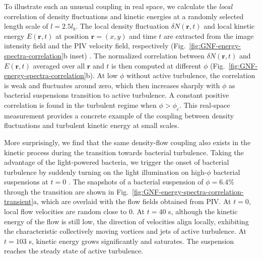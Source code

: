 \documentclass[twocolumn,aps,prx,amsmath,amssymb,longbibliography]{revtex4-2}
\begin{document}
To illustrate such an unusual coupling in real space, we calculate the \emph{local} correlation of density fluctuations and kinetic energies at a randomly selected length scale of $l = 2.5l_b$. The local density fluctuation $\delta N(\mathbf{r},t)$ and local kinetic energy $E(\mathbf{r},t)$ at position $\mathbf{r} = (x,y)$ and time $t$ are extracted from the image intensity field and the PIV velocity field, respectively (Fig.~\ref{fig:GNF-energy-spectra-correlation}b inset) \cite{Liu2020}.
The normalized correlation between $\delta N(\mathbf{r},t)$ and $E(\mathbf{r},t)$ averaged over all $\mathbf{r}$ and $t$ is then computed at different $\phi$ (Fig.~\ref{fig:GNF-energy-spectra-correlation}b). At low $\phi$ without active turbulence, the correlation is weak and fluctuates around zero, which then increases sharply with $\phi$ as bacterial suspensions transition to active turbulence. A constant positive correlation is found in the turbulent regime when $\phi > \phi_c$. This real-space measurement provides a concrete example of the coupling between density fluctuations and turbulent kinetic energy at small scales.



More surprisingly, we find that the same density-flow coupling also exists in the kinetic process during the transition towards bacterial turbulence. Taking the advantage of the light-powered bacteria, we trigger the onset of bacterial turbulence by suddenly turning on the light illumination on high-$\phi$ bacterial suspensions at $t=0$ \cite{Peng2020}.
The snapshots of a bacterial suspension of $\phi = 6.4\%$ through the transition are shown in Fig.~\ref{fig:GNF-energy-spectra-correlation-transient}a, which are overlaid with the flow fields obtained from PIV. At $t=0$, local flow velocities are random close to 0. At $t=40$ s, although the kinetic energy of the flow is still low, the direction of velocities align locally, exhibiting the characteristic collectively moving vortices and jets of active turbulence. At $t=103$ s, kinetic energy grows significantly and saturates. The suspension reaches the steady state of active turbulence.
\end{document}
